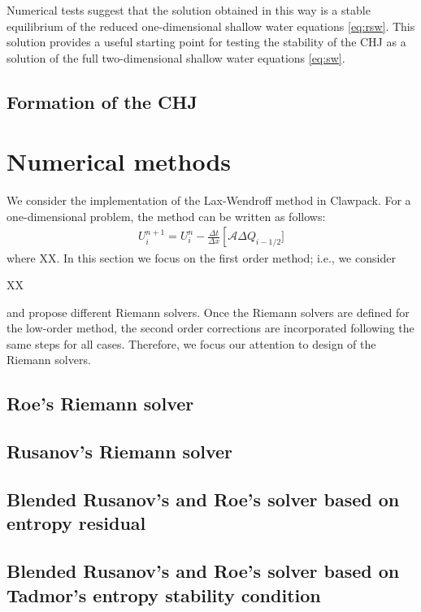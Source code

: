 \documentclass[preprint, 11pt]{article}
\newcommand{\A}{{\mathcal A}}
\begin{document}
Numerical tests suggest that the solution obtained in this way is a stable equilibrium
of the reduced one-dimensional shallow water equations \eqref{eq:rsw}.  This
solution provides a useful starting point for testing the stability of the CHJ
as a solution of the full two-dimensional shallow water equations \eqref{eq:sw}.

\subsection{Formation of the CHJ}

\section{Numerical methods}
We consider the implementation of the Lax-Wendroff method in Clawpack. 
For a one-dimensional problem, the method can be written as follows:
\begin{align*}
  U_i^{n+1}=U_i^n-\frac{\Delta t}{\Delta x}\left[\A\Delta Q_{i-1/2}]
\end{align*}
where XX. In this section we focus on the first order method; i.e., we consider 

XX 

and propose different Riemann solvers. Once the Riemann solvers are defined for the low-order method, 
the second order corrections are incorporated following the same steps for all cases. Therefore, we focus our 
attention to design of the Riemann solvers. 

\subsection{Roe's Riemann solver}

\subsection{Rusanov's Riemann solver}

\subsection{Blended Rusanov's and Roe's solver based on entropy residual}

\subsection{Blended Rusanov's and Roe's solver based on Tadmor's entropy stability condition}
\end{document}
